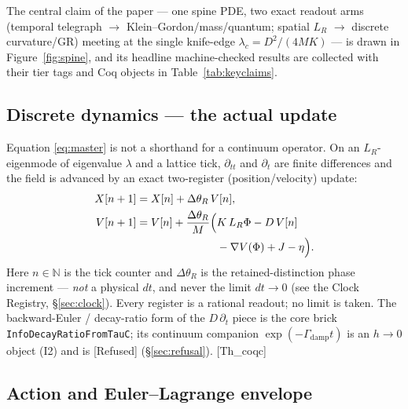 \documentclass[10pt,twocolumn]{article}
\theoremstyle{definition}
\newcommand{\Thq}{\textsf{[Th\_coqc]}}
\newcommand{\Refu}{\textsf{[Refused]}}
\newcommand{\code}[1]{\texttt{#1}}
\newcommand{\LR}{L_{R}}
\begin{document}
The central claim of the paper --- one spine PDE, two exact readout arms (temporal
telegraph $\to$ Klein--Gordon/mass/quantum; spatial $\LR$ $\to$ discrete curvature/GR)
meeting at the single knife-edge $\lambda_c=D^2/(4MK)$ --- is drawn in
Figure~\ref{fig:spine}, and its headline machine-checked results are collected with their
tier tags and Coq objects in Table~\ref{tab:keyclaims}.





\subsection{Discrete dynamics --- the actual update}\label{sec:spine-dyn}

Equation \eqref{eq:master} is not a shorthand for a continuum operator. On an
$\LR$-eigenmode of eigenvalue $\lambda$ and a lattice tick, $\partial_{tt}$ and
$\partial_{t}$ are finite differences and the field is advanced by an exact two-register
(position/velocity) update:
\begin{align}
X[n+1] &= X[n] + \Delta\theta_R\,V[n], \label{eq:updX}\\
V[n+1] &= V[n] + \frac{\Delta\theta_R}{M}\Bigl(K\,\LR\Phi - D\,V[n] \notag\\
  &\hphantom{{}= V[n] + \frac{\Delta\theta_R}{M}\Bigl(}{} - \nabla V(\Phi)
  + J - \eta\Bigr). \label{eq:updV}
\end{align}
Here $n\in\mathbb{N}$ is the tick counter and $\Delta\theta_R$ is the retained-distinction
phase increment --- \emph{not} a physical $dt$, and never the limit $dt\to 0$ (see the Clock
Registry, \S\ref{sec:clock}). Every register is a rational readout; no limit is taken. The
backward-Euler / decay-ratio form of the $D\,\partial_t$ piece is the core brick
\code{InfoDecayRatioFromTauC}; its continuum companion $\exp(-\Gamma_{\mathrm{damp}} t)$ is an $h\!\to\!0$
object (I2) and is \Refu{} (\S\ref{sec:refusal}). \Thq{}

\subsection{Action and Euler--Lagrange envelope}\label{sec:spine-action}
\end{document}
